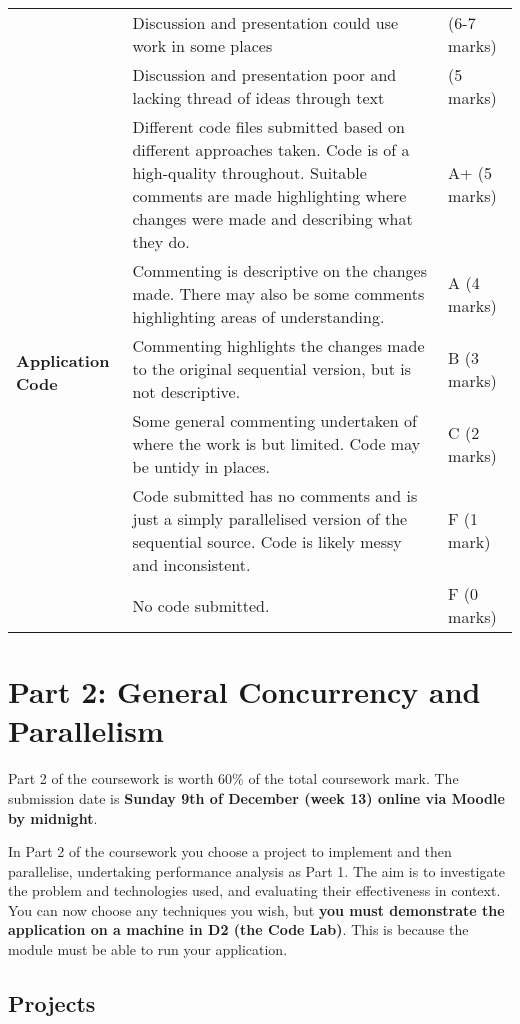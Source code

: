 \documentclass[a4paper, 12pt]{article}
\begin{document}
\begin{table}[H]
\begin{tabularx}{\textwidth}{|l|X|l|}
		& Discussion and presentation could use work in some places & (6-7 marks) \\
		\cline{2-3}
		& Discussion and presentation poor and lacking thread of ideas through text & (5 marks) \\
		\hline
		\multirow{6}{*}{\textbf{Application	Code}} &	Different code files submitted based on different approaches taken. Code is	of a high-quality throughout. Suitable comments are made highlighting where changes were made and describing what they do. & A+ (5 marks) \\
		\cline{2-3}
		& Commenting is descriptive on the changes made. There may also be some comments highlighting areas of understanding. & A (4 marks) \\
		\cline{2-3}
		& Commenting highlights the changes made to the original sequential version, but is not descriptive. & B (3 marks) \\
		\cline{2-3}
		& Some general commenting undertaken of where the work is but limited. Code may be untidy in places. & C (2 marks) \\
		\cline{2-3}
		& Code submitted has no comments and is just a simply parallelised version of the sequential source. Code is likely messy and inconsistent. & F (1 mark) \\
		\cline{2-3}
		& No code submitted. & F (0 marks) \\
		\hline
	\end{tabularx}
\end{table}

\newpage

\section*{Part 2: General Concurrency and Parallelism}

Part 2 of the coursework is worth 60\% of the total coursework mark. The submission date is \textbf{Sunday 9th of December (week 13) online via Moodle by midnight}.

In Part 2 of the coursework you choose a project to implement and then parallelise, undertaking performance analysis as Part 1. The aim is to investigate the problem and technologies used, and evaluating their effectiveness in context. You can now choose any techniques you wish, but \textbf{you must demonstrate the application on a machine in D2 (the Code Lab)}. This is because the module must be able to run your application.

\subsection*{Projects}
\end{document}
